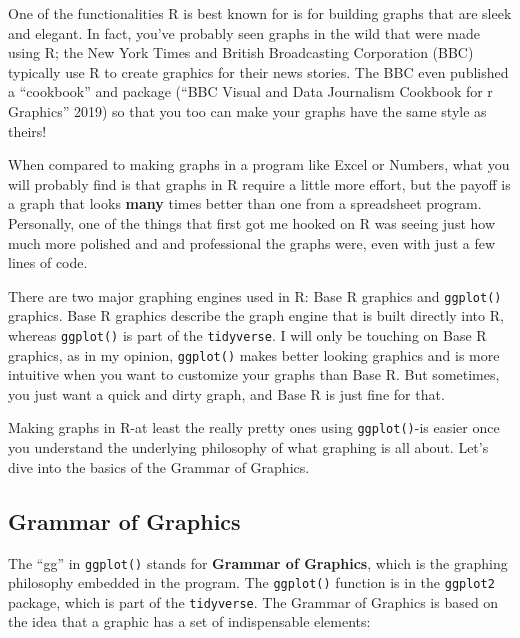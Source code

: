 \documentclass[
  letterpaper,
]{book}
\begin{document}
One of the functionalities R is best known for is for building graphs
that are sleek and elegant. In fact, you've probably seen graphs in the
wild that were made using R; the New York Times and British Broadcasting
Corporation (BBC) typically use R to create graphics for their news
stories. The BBC even published a ``cookbook'' and package ({``BBC
Visual and Data Journalism Cookbook for r Graphics''} 2019) so that you
too can make your graphs have the same style as theirs!

When compared to making graphs in a program like Excel or Numbers, what
you will probably find is that graphs in R require a little more effort,
but the payoff is a graph that looks \textbf{many} times better than one
from a spreadsheet program. Personally, one of the things that first got
me hooked on R was seeing just how much more polished and and
professional the graphs were, even with just a few lines of code.

There are two major graphing engines used in R: Base R graphics and
\texttt{ggplot()} graphics. Base R graphics describe the graph engine
that is built directly into R, whereas \texttt{ggplot()} is part of the
\texttt{tidyverse}. I will only be touching on Base R graphics, as in my
opinion, \texttt{ggplot()} makes better looking graphics and is more
intuitive when you want to customize your graphs than Base R. But
sometimes, you just want a quick and dirty graph, and Base R is just
fine for that.

Making graphs in R-at least the really pretty ones using
\texttt{ggplot()}-is easier once you understand the underlying
philosophy of what graphing is all about. Let's dive into the basics of
the Grammar of Graphics.

\subsection{Grammar of Graphics}\label{grammar-of-graphics}

The ``gg'' in \texttt{ggplot()} stands for \textbf{Grammar of Graphics},
which is the graphing philosophy embedded in the program. The
\texttt{ggplot()} function is in the \texttt{ggplot2} package, which is
part of the \texttt{tidyverse}. The Grammar of Graphics is based on the
idea that a graphic has a set of indispensable elements:
\end{document}
